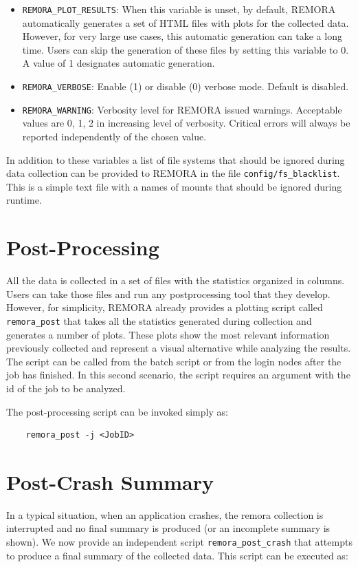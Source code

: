 \documentclass[10pt,a4paper]{report}
\begin{document}
{\begin{itemize}
    \item \texttt{REMORA\_PLOT\_RESULTS}: When this variable is unset, by default, REMORA automatically generates a set of HTML files with plots for the collected data. However, for very large use cases, this automatic generation can take a long time. Users can skip the generation of these files by setting this variable to 0. A value of 1 designates automatic generation.

	\item \texttt{REMORA\_VERBOSE}: Enable (1) or disable (0) verbose mode. Default is disabled.
	
	\item \texttt{REMORA\_WARNING}: Verbosity level for REMORA issued warnings. Acceptable values are 0, 1, 2 in increasing level of verbosity. Critical errors will always be reported independently of the chosen value.
\end{itemize}
}

In addition to these variables a list of file systems that should be ignored during data collection can be provided to REMORA in the file \verb+config/fs_blacklist+. This is a simple text file with a names of mounts that should be ignored during runtime.

\section{Post-Processing}
All the data is collected in a set of files with the statistics organized in columns. Users can take those files and run any postprocessing tool that they develop. However, for simplicity, REMORA already provides a plotting script called \verb+remora_post+ that takes all the statistics generated during collection and generates a number of plots. These plots show the most relevant information previously collected and represent a visual alternative while analyzing the results. The script can be called from the batch script or from the login nodes after the job has finished. In this second scenario, the script requires an argument with the id of the job to be analyzed.

The post-processing script can be invoked simply as:

\begin{verbatim}
	remora_post -j <JobID>
\end{verbatim}

\section{Post-Crash Summary}
In a typical situation, when an application crashes, the remora collection is interrupted and no final summary is produced (or an incomplete summary is shown). We now provide an independent script \texttt{remora\_post\_crash} that attempts to produce a final summary of the collected data. This script can be executed as:
\end{document}
